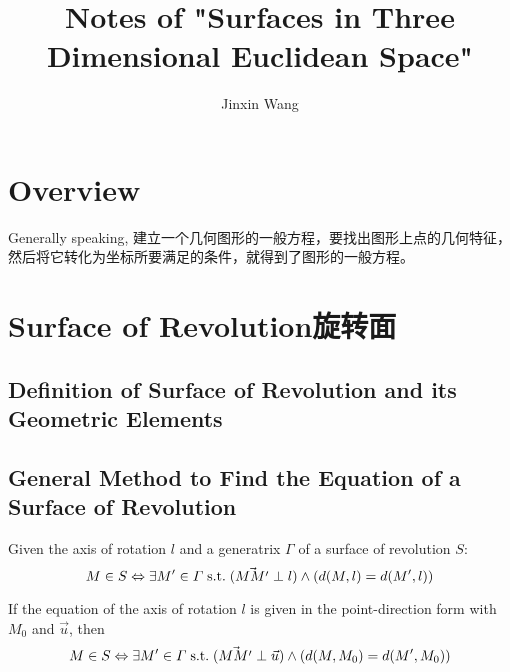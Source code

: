 \documentclass[onecolumn]{ctexart}
\title{Notes of "Surfaces in Three Dimensional Euclidean Space"}
\author{Jinxin Wang}
\date{}
\begin{document}
\maketitle

\section{Overview}

Generally speaking, 建立一个几何图形的一般方程，要找出图形上点的几何特征，然后将它转化为坐标所要满足的条件，就得到了图形的一般方程。

\section{Surface of Revolution旋转面}

\subsection{Definition of Surface of Revolution and its Geometric Elements}

\subsection{General Method to Find the Equation of a Surface of Revolution}

Given the axis of rotation $l$ and a generatrix $\varGamma$ of a surface of revolution $S$:
\begin{equation}
  M \in S \Leftrightarrow \exists M' \in \varGamma \thickspace \textnormal{s.t.} \thickspace (\vec{MM'} \perp l) \wedge (d(M, l) = d(M', l))
\end{equation}

If the equation of the axis of rotation $l$ is given in the point-direction form with $M_0$ and $\vec{u}$, then
\begin{equation}
  M \in S \Leftrightarrow \exists M' \in \varGamma \thickspace \textnormal{s.t.} \thickspace (\vec{MM'} \perp \vec{u}) \wedge (d(M, M_0) = d(M', M_0)) 
\end{equation}
\end{document}
